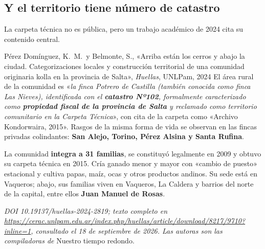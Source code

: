 \subsection*{Y el territorio tiene número de catastro}

La carpeta técnica no es pública, pero un trabajo académico de 2024 cita su contenido central.

\begin{ficha}{Pérez Domínguez, K.\ M.\ y Belmonte, S., «Arriba están los cerros y abajo la ciudad. Categorizaciones locales y construcción territorial de una comunidad originaria kolla en la provincia de Salta», \textit{Huellas}, UNLPam, 2024}
El área rural de la comunidad es «\textit{la finca Potrero de Castilla (también conocida como finca Las Nieves), identificada con el \textbf{catastro Nº102}, formalmente caracterizado como \textbf{propiedad fiscal de la provincia de Salta} y reclamado como territorio comunitario en la Carpeta Técnica}», con cita de la carpeta como «Archivo Kondorwaira, 2015». Rasgos de la misma forma de vida se observan en las fincas privadas colindantes: \textbf{San Alejo, Torino, Pérez Alsina y Santa Rufina}.

La comunidad \textbf{integra a 31 familias}, se constituyó legalmente en 2009 y obtuvo su carpeta técnica en 2015. Cría ganado menor y mayor con «cambio de puesto» estacional y cultiva papas, maíz, ocas y otros productos andinos. Su sede está en Vaqueros; abajo, sus familias viven en Vaqueros, La Caldera y barrios del norte de la capital, entre ellos \textbf{Juan Manuel de Rosas}.

\textit{DOI 10.19137/huellas-2024-2819; texto completo en \url{https://cerac.unlpam.edu.ar/index.php/huellas/article/download/8217/9710?inline=1}, consultado el 18 de septiembre de 2026. Las autoras son las compiladoras de} Nuestro tiempo redondo.
\end{ficha}

